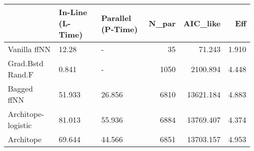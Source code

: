 \begin{tabular}{lllrrr}
\toprule
{} & In-Line (L-Time) & Parallel (P-Time) &  N\_par &   AIC\_like &    Eff \\
\midrule
Vanilla ffNN       &            12.28 &                 - &     35 &     71.243 &  1.910 \\
Grad.Bstd Rand.F   &            0.841 &                 - &   1050 &   2100.894 &  4.448 \\
Bagged ffNN        &           51.933 &            26.856 &   6810 &  13621.184 &  4.883 \\
Architope-logistic &           81.013 &            55.936 &   6884 &  13769.407 &  4.374 \\
Architope          &           69.644 &            44.566 &   6851 &  13703.157 &  4.953 \\
\bottomrule
\end{tabular}
